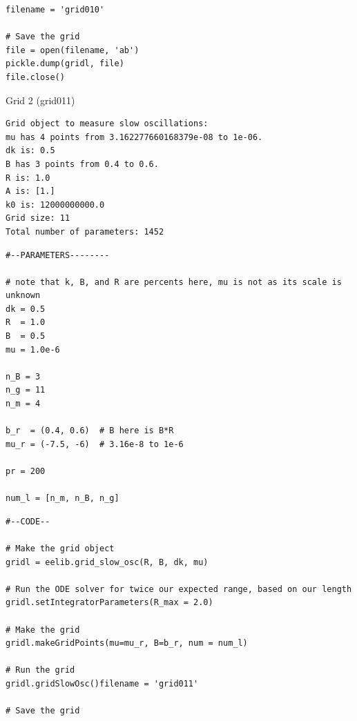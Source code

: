 \documentclass[11pt]{article}
\makeatletter
\newcommand{\boxspacing}{\kern\kvtcb@left@rule\kern\kvtcb@boxsep}
\newcommand{\prompt}[4]{
        {\ttfamily\llap{{\color{#2}[#3]:\hspace{3pt}#4}}\vspace{-\baselineskip}}
    }
\makeatother
\begin{document}
\begin{tcolorbox}[breakable, size=fbox, boxrule=1pt, pad at break*=1mm,colback=cellbackground, colframe=cellborder]
\prompt{In}{incolor}{41}{\boxspacing}
\begin{Verbatim}[commandchars=\\\{\}]
filename = 'grid010'

# Save the grid
file = open(filename, 'ab')
pickle.dump(gridl, file)
file.close()
\end{Verbatim}
\end{tcolorbox}
    Grid 2 (grid011)
\begin{tcolorbox}[breakable, size=fbox, boxrule=1pt, pad at break*=1mm,colback=cellbackground, colframe=cellborder]
\prompt{In}{incolor}{41}{\boxspacing}
\begin{Verbatim}[commandchars=\\\{\}]
Grid object to measure slow oscillations:
mu has 4 points from 3.162277660168379e-08 to 1e-06.
dk is: 0.5
B has 3 points from 0.4 to 0.6.
R is: 1.0
A is: [1.]
k0 is: 12000000000.0
Grid size: 11
Total number of parameters: 1452
\end{Verbatim}
\end{tcolorbox}
\begin{tcolorbox}[breakable, size=fbox, boxrule=1pt, pad at break*=1mm,colback=cellbackground, colframe=cellborder]
\prompt{In}{incolor}{41}{\boxspacing}
\begin{Verbatim}[commandchars=\\\{\}]
#--PARAMETERS--------

# note that k, B, and R are percents here, mu is not as its scale is unknown
dk = 0.5
R  = 1.0
B  = 0.5
mu = 1.0e-6

n_B = 3
n_g = 11
n_m = 4

b_r  = (0.4, 0.6)  # B here is B*R 
mu_r = (-7.5, -6)  # 3.16e-8 to 1e-6

pr = 200

num_l = [n_m, n_B, n_g]
\end{Verbatim}
\end{tcolorbox}
\begin{tcolorbox}[breakable, size=fbox, boxrule=1pt, pad at break*=1mm,colback=cellbackground, colframe=cellborder]
\prompt{In}{incolor}{41}{\boxspacing}
\begin{Verbatim}[commandchars=\\\{\}]
#--CODE--

# Make the grid object
gridl = eelib.grid_slow_osc(R, B, dk, mu)

# Run the ODE solver for twice our expected range, based on our length
gridl.setIntegratorParameters(R_max = 2.0)

# Make the grid
gridl.makeGridPoints(mu=mu_r, B=b_r, num = num_l)

# Run the grid
gridl.gridSlowOsc()filename = 'grid011'

# Save the grid
\end{Verbatim}
\end{tcolorbox}
\end{document}
